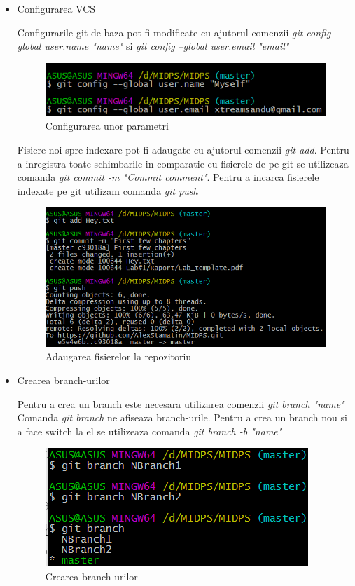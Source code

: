 \begin{itemize}
\item Configurarea VCS

Configurarile git de baza pot fi modificate cu ajutorul comenzii \textit{git config --global user.name "name"} si \textit{git config --global user.email "email"}

\begin{figure}[h!]
			\centering
 			 \includegraphics[scale=0.75]{"task 3 gitconfig"}
 			 \caption{Configurarea unor parametri}
 			 \label{fig:clone_repo}
		\end{figure}
		
Fisiere noi spre indexare pot fi adaugate cu ajutorul comenzii \textit{git add}. Pentru a inregistra toate schimbarile in comparatie cu fisierele de pe git se utilizeaza comanda \textit{git commit -m "Commit comment"}. Pentru a incarca fisierele indexate pe git utilizam comanda \textit{git push}

\begin{figure}[h!]
			\centering
 			 \includegraphics[scale=0.75]{"task 3 commit"}
 			 \caption{Adaugarea fisierelor la repozitoriu}
 			 \label{fig:clone_repo}
		\end{figure}
		
\item Crearea branch-urilor

Pentru a crea un branch este necesara utilizarea comenzii \textit{git branch "name"} Comanda \textit{git branch} ne afiseaza branch-urile. Pentru a crea un branch nou si a face switch la el se utilizeaza comanda \textit{git branch -b "name"}

\begin{figure}[h!]
			\centering
 			 \includegraphics[scale=0.75]{"task 4 create branch"}
 			 \caption{Crearea branch-urilor}
 			 \label{fig:clone_repo}
		\end{figure}


\end{itemize}

